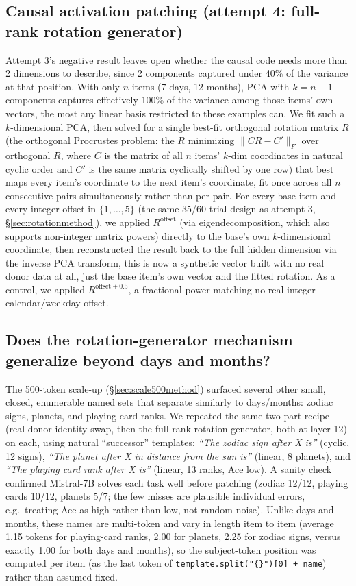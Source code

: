 \documentclass[11pt]{article}
\begin{document}
\subsection{Causal activation patching (attempt 4: full-rank rotation generator)}
\label{sec:highdimmethod}
Attempt 3's negative result leaves open whether the causal code needs more
than 2 dimensions to describe, since 2 components captured under 40\% of the
variance at that position. With only $n$ items (7 days, 12 months), PCA with
$k = n{-}1$ components captures effectively 100\% of the variance among those
items' own vectors, the most any linear basis restricted to these examples
can. We fit such a $k$-dimensional PCA, then solved for a single best-fit
orthogonal rotation matrix $R$ (the orthogonal Procrustes problem: the $R$
minimizing $\lVert C R - C' \rVert_F$ over orthogonal $R$, where $C$ is the
matrix of all $n$ items' $k$-dim coordinates in natural cyclic order and $C'$
is the same matrix cyclically shifted by one row) that best maps every
item's coordinate to the next item's coordinate, fit once across all $n$
consecutive pairs simultaneously rather than per-pair. For every base item
and every integer offset in $\{1, \ldots, 5\}$ (the same 35/60-trial design
as attempt 3, \S\ref{sec:rotationmethod}), we applied $R^{\text{offset}}$
(via eigendecomposition, which
also supports non-integer matrix powers) directly to the base's own
$k$-dimensional coordinate, then reconstructed the result back to the full
hidden dimension via the inverse PCA transform, this is now a synthetic
vector built with no real donor data at all, just the base item's own vector
and the fitted rotation. As a control, we applied $R^{\text{offset}+0.5}$, a
fractional power matching no real integer calendar/weekday offset.

\subsection{Does the rotation-generator mechanism generalize beyond days and months?}
\label{sec:generalizemethod}
The 500-token scale-up (\S\ref{sec:scale500method}) surfaced several other
small, closed, enumerable named sets that separate similarly to days/months:
zodiac signs, planets, and playing-card ranks. We repeated the same two-part
recipe (real-donor identity swap, then the full-rank rotation generator, both
at layer 12) on each, using natural ``successor'' templates: \emph{``The
zodiac sign after X is''} (cyclic, 12 signs), \emph{``The planet after X in
distance from the sun is''} (linear, 8 planets), and \emph{``The playing card
rank after X is''} (linear, 13 ranks, Ace low). A sanity check confirmed
Mistral-7B solves each task well before patching (zodiac 12/12, playing cards
10/12, planets 5/7; the few misses are plausible individual errors, e.g.\
treating Ace as high rather than low, not random noise). Unlike days and
months, these names are multi-token and vary in length item to item (average
1.15 tokens for playing-card ranks, 2.00 for planets, 2.25 for zodiac signs,
versus exactly 1.00 for both days and months), so the subject-token position
was computed per item (as the last token of \texttt{template.split("\{\}")[0]
+ name}) rather than assumed fixed.
\end{document}

